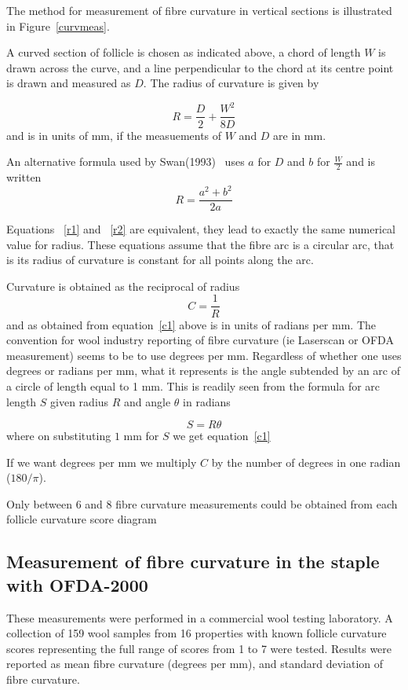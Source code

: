 \documentclass[titlepage]{article}  %
\begin{document}
The method for measurement of fibre curvature in vertical sections is illustrated in Figure~\ref{curvmeas}.



A curved section of follicle is chosen as indicated above, a chord of length $W$ is drawn across the curve, and a line perpendicular to the chord at its centre point is drawn and measured as $D$. The radius of curvature is given by

\begin{equation}
\label{r1}
R = \frac{D}{2} + \frac{W^{2}}{8 D}
\end{equation}
and is in units of mm, if the measuements of $W$ and $D$ are in mm.

An alternative formula used by Swan(1993)~\cite{swan:93} uses $a$ for $D$ and $b$ for $\frac{W}{2}$ and is written
\begin{equation}
\label{r2}
R = \frac{a^{2} + b^{2}}{2 a}
\end{equation}

Equations ~\ref{r1} and ~\ref{r2} are equivalent, they lead to exactly the same numerical value for radius.  These equations assume that the fibre arc is a circular arc, that is its radius of curvature is constant for all points along the arc. 

Curvature is obtained as the reciprocal of radius
\begin{equation}
\label{c1}
C = \frac{1}{R}
\end{equation}
and as obtained from equation~\ref{c1} above is in units of radians per mm.  The convention for wool industry reporting of fibre curvature (ie Laserscan or OFDA measurement) seems to be to use degrees per mm. Regardless of whether one uses degrees or radians per mm, what it represents is the angle subtended by an arc of a circle of length equal to 1 mm. This is readily seen from the formula for arc length $S$ given radius $R$ and angle $\theta$ in radians

\begin{equation}
\label{c2}
S = R \theta
\end{equation}
where on substituting $1$ mm for $S$ we get equation~\ref{c1}

If we want degrees per mm we multiply $C$ by the number of degrees in one radian ($180/\pi$).

Only between 6 and 8 fibre curvature measurements could be obtained from each follicle curvature score diagram

\subsection{Measurement of fibre curvature in the staple with OFDA-2000}
These measurements were performed in a commercial wool testing laboratory. A collection of 159 wool samples from 16 properties with known follicle curvature scores representing the full range of scores from 1 to 7 were tested. Results were reported as mean fibre curvature (degrees per mm), and standard deviation of fibre curvature.
\end{document}
